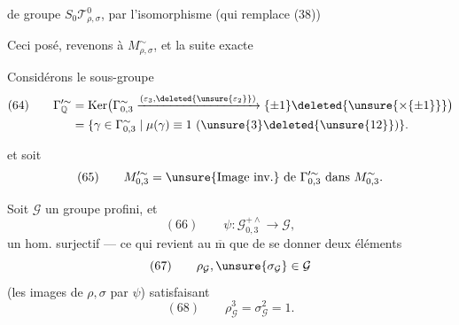 

de groupe   $S_0\mathcal{T}_{\rho,\sigma}^{0}$, par l'isomorphisme (qui remplace (38))

Ceci posé, revenons à $M_{\rho,\sigma}^{\sim}$, et la suite exacte

Considérons le sous-groupe
\[
\begin{aligned}
(64)\qquad
\Gamma_{\mathbb Q}^{\prime\sim}
 &= \operatorname{Ker}\bigl(\Gamma_{0,3}^{\sim}
 \xrightarrow{(\varepsilon_3,\deleted{\unsure{\varepsilon_2}})}
 \{\pm1\}\deleted{\unsure{\times\{\pm1\}}}\bigr)\\
 &= \{\gamma\in\Gamma_{0,3}^{\sim}\mid\mu(\gamma)\equiv1\ (\unsure{3}\deleted{\unsure{12}})\}.
\end{aligned}
\]

et soit 
\[
 (65)\qquad M_{0,3}^{\prime\sim}
 = \text{\unsure{Image inv.} de }\Gamma_{0,3}^{\prime\sim}\text{ dans }M_{0,3}^{\sim}.
\]

Soit $\mathcal{G}$ un groupe profini, et
\[
 (66)\qquad\psi:\mathcal{G}_{0,3}^{+\wedge}\longrightarrow\mathcal{G},
\]
un hom.  surjectif --- ce qui revient au $\overline{\mathrm m}$ que de se donner deux éléments
\[
 (67)\qquad\rho_{\mathcal{G}},\unsure{\sigma_{\mathcal{G}}}\in\mathcal{G}
\]
(les images de $\rho,\sigma$ par $\psi$) satisfaisant
\[
 (68)\qquad\rho_{\mathcal{G}}^3=\sigma_{\mathcal{G}}^2=1.
\]


